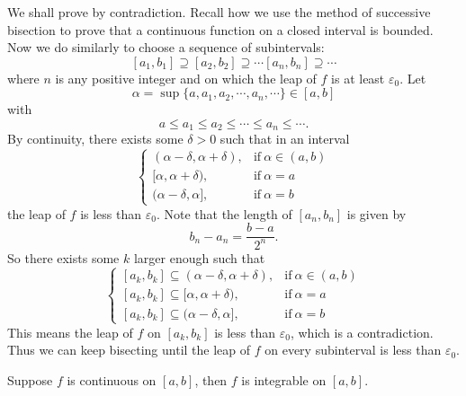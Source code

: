 	\begin{proofenv}
		We shall prove by contradiction. Recall how we use the method of successive bisection to prove that a continuous function on a closed interval is bounded. Now we do similarly to choose a sequence of subintervals:
		\[
		[a_1,b_1]\supseteq [a_2,b_2]\supseteq \cdots [a_n,b_n] \supseteq \cdots
		\]
		where $n$ is any positive integer and on which the leap of $f$ is at least $\varepsilon_0$. Let 
		\[
		\alpha = \sup \{a,a_1,a_2,\cdots,a_n,\cdots\} \in [a,b]
		\]
		with
		\[
		a\le a_1 \le a_2 \le \cdots \le a_n \le \cdots.
		\]
		By continuity, there exists some $\delta>0$ such that in an interval
		\[
		\begin{cases}
		(\alpha-\delta, \alpha + \delta), & \text{if}\ \alpha\in (a,b)\\[4pt]
		[\alpha, \alpha + \delta), & \text{if}\ \alpha=a\\[4pt]
		(\alpha - \delta, \alpha], & \text{if}\ \alpha=b
		\end{cases}
		\]
		the leap of $f$ is less than $\varepsilon_0$. Note that the length of $[a_n,b_n]$ is given by
		\[
		b_n - a_n = \frac{b-a}{2^n}.
		\]
		So there exists some $k$ larger enough such that
		\[
		\begin{cases}
			[a_k,b_k] \subseteq (\alpha-\delta, \alpha + \delta), & \text{if}\ \alpha\in (a,b)\\[4pt]
			[a_k,b_k] \subseteq [\alpha, \alpha + \delta), & \text{if}\ \alpha=a\\[4pt]
			[a_k,b_k] \subseteq (\alpha - \delta, \alpha], & \text{if}\ \alpha=b
		\end{cases}
		\]
		This means the leap of $f$ on $[a_k,b_k]$ is less than $\varepsilon_0$, which is a contradiction. Thus we can keep bisecting until the leap of $f$ on every subinterval is less than $\varepsilon_0$.
	\end{proofenv}
	\begin{theoremenv}
		Suppose $f$ is continuous on $[a,b]$, then $f$ is integrable on $[a,b]$.
	\end{theoremenv}
